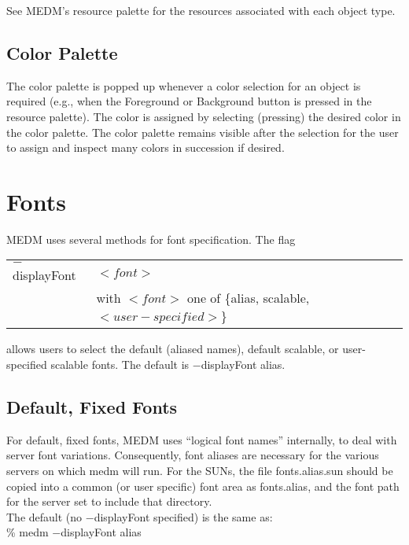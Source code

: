 \noindent See MEDM's resource palette for the resources associated with each
object type.

\subsection{Color Palette}

The color palette is popped up whenever a color selection for an object
is required (e.g., when the Foreground or Background button is pressed
in the resource palette).  The color is assigned by selecting (pressing)
the desired color in the color palette.  The color palette remains
visible after the selection for the user to assign and inspect
many colors in succession if desired.


\section{Fonts}

MEDM uses several methods for font specification.  The flag\\

\begin{tabular}{ll}
$-$displayFont & $<font>$ \\
	     & with $<font>$ one of \{alias, scalable, $<user-specified>$\}\\
\end{tabular}
\vspace{12pt}

\noindent allows users to select the default (aliased names), default scalable,
or user-specified scalable fonts.  The default is $-$displayFont alias.

\subsection{Default, Fixed Fonts}

For default, fixed fonts, MEDM uses ``logical font names'' internally, to deal
with server font variations.  Consequently, font aliases are necessary for the
various servers on which medm will run.  For the SUNs, the file
fonts.alias.sun should be copied into a common (or user specific) font area
as fonts.alias, and the font path for the server set to include that
directory.\\

\noindent The default (no $-$displayFont specified) is the same as:\\

\% medm $-$displayFont alias\\

